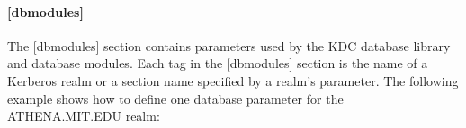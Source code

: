\documentclass[letterpaper,10pt,english]{sphinxmanual}
\begin{document}
\paragraph{{[}dbmodules{]}}
\label{\detokenize{admin/conf_files/kdc_conf:dbmodules}}\label{\detokenize{admin/conf_files/kdc_conf:id3}}
The {[}dbmodules{]} section contains parameters used by the KDC database
library and database modules.  Each tag in the {[}dbmodules{]} section is
the name of a Kerberos realm or a section name specified by a realm’s
 parameter.  The following example shows how to
define one database parameter for the ATHENA.MIT.EDU realm:

%
\begin{sphinxVerbatim}[commandchars=\\\{\}]
\PYG{p}{[}\PYG{p}{]}
      
          
\end{sphinxVerbatim}
\end{document}

